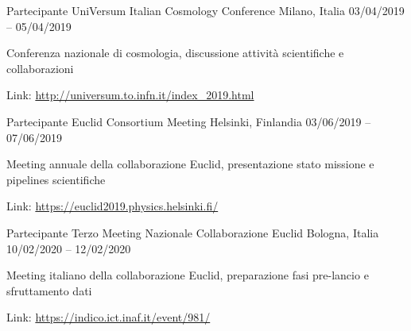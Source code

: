 


\begin{cventries}


\cventry
{Partecipante} %
{UniVersum Italian Cosmology Conference} %
{Milano, Italia} %
{03/04/2019 -- 05/04/2019} %
{ %
\begin{cvitems}
\item {Conferenza nazionale di cosmologia, discussione attività scientifiche e collaborazioni}
\item {Link: \url{http://universum.to.infn.it/index_2019.html}}
\end{cvitems}
}


\cventry
{Partecipante} %
{Euclid Consortium Meeting} %
{Helsinki, Finlandia} %
{03/06/2019 -- 07/06/2019} %
{ %
\begin{cvitems}
\item {Meeting annuale della collaborazione Euclid, presentazione stato missione e pipelines scientifiche}
\item {Link: \url{https://euclid2019.physics.helsinki.fi/}}
\end{cvitems}
}


\cventry
{Partecipante} %
{Terzo Meeting Nazionale Collaborazione Euclid} %
{Bologna, Italia} %
{10/02/2020 -- 12/02/2020} %
{ %
\begin{cvitems}
\item {Meeting italiano della collaborazione Euclid, preparazione fasi pre-lancio e sfruttamento dati}
\item {Link: \url{https://indico.ict.inaf.it/event/981/}}
\end{cvitems}
}


\end{cventries}
